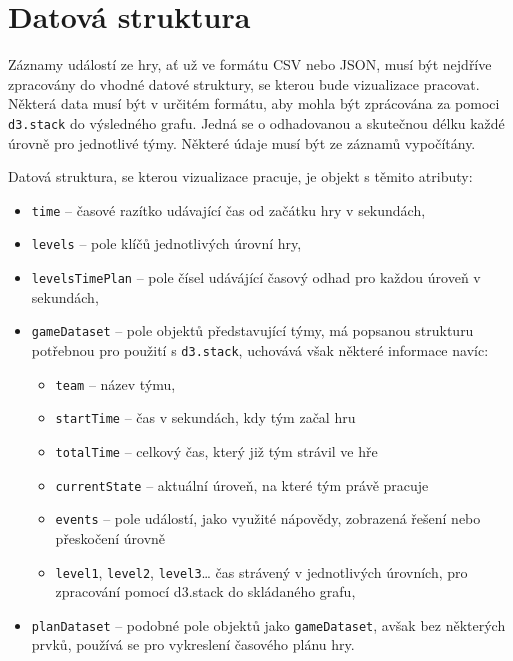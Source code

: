 \documentclass[
  digital, %
  oneside, %
  table,   %
  nolof,     %
  nolot,     %
]{fithesis3}
\begin{document}
\section{Datová struktura}
Záznamy událostí ze hry, ať už ve formátu CSV nebo JSON, musí být nejdříve zpracovány do vhodné datové struktury, se kterou bude vizualizace pracovat. Některá data musí být v určitém formátu, aby mohla být zprácována za pomoci \verb|d3.stack| do výsledného grafu. Jedná se o odhadovanou a skutečnou délku každé úrovně pro jednotlivé týmy. Některé údaje musí být ze záznamů vypočítány.\par Datová struktura, se kterou vizualizace pracuje, je objekt s těmito atributy:
\begin{itemize}
  \item \verb|time| – časové razítko udávající čas od začátku hry v sekundách,
  \item \verb|levels| – pole klíčů jednotlivých úrovní hry,
  \item \verb|levelsTimePlan| – pole čísel udávájící časový odhad pro každou úroveň v sekundách,
  \item \verb|gameDataset| – pole objektů představující týmy, má popsanou strukturu potřebnou pro použití s \verb|d3.stack|, uchovává však některé informace navíc:
  	\begin{itemize}
		\item \verb|team| – název týmu,
		\item \verb|startTime| – čas v sekundách, kdy tým začal hru
		\item \verb|totalTime| – celkový čas, který již tým strávil ve hře
		\item \verb|currentState| – aktuální úroveň, na které tým právě pracuje
		\item \verb|events| – pole událostí, jako využité nápovědy, zobrazená řešení nebo přeskočení úrovně
		\item \verb|level1|, \verb|level2|, \verb|level3|… čas strávený v jednotlivých úrovních, pro zpracování pomocí d3.stack do skládaného grafu,
	\end{itemize}
  \item \verb|planDataset| – podobné pole objektů jako \verb|gameDataset|, avšak bez některých prvků, používá se pro vykreslení časového plánu hry.
\end{itemize}
\end{document}

